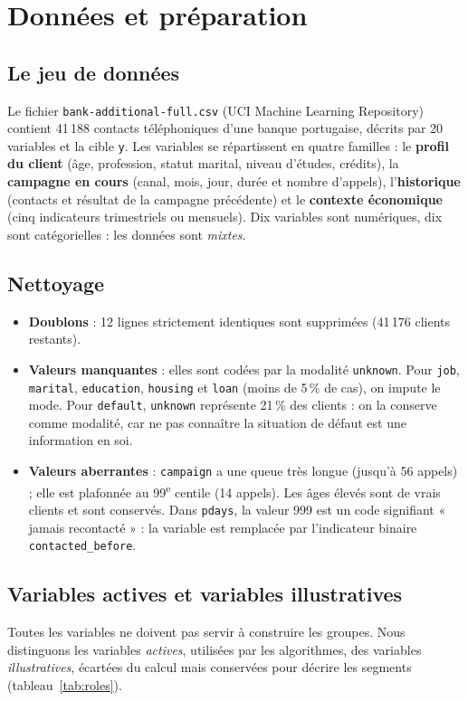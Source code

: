 \documentclass[11pt,a4paper]{article}
\begin{document}
\section{Données et préparation}\label{sec:donnees}

\subsection{Le jeu de données}
Le fichier \texttt{bank-additional-full.csv} (UCI Machine Learning Repository) contient 41\,188 contacts téléphoniques d'une banque portugaise, décrits par 20 variables et la cible \texttt{y}. Les variables se répartissent en quatre familles : le \textbf{profil du client} (âge, profession, statut marital, niveau d'études, crédits), la \textbf{campagne en cours} (canal, mois, jour, durée et nombre d'appels), l'\textbf{historique} (contacts et résultat de la campagne précédente) et le \textbf{contexte économique} (cinq indicateurs trimestriels ou mensuels). Dix variables sont numériques, dix sont catégorielles : les données sont \emph{mixtes}.

\subsection{Nettoyage}
\begin{itemize}
\item \textbf{Doublons} : 12 lignes strictement identiques sont supprimées (41\,176 clients restants).
\item \textbf{Valeurs manquantes} : elles sont codées par la modalité \texttt{unknown}. Pour \texttt{job}, \texttt{marital}, \texttt{education}, \texttt{housing} et \texttt{loan} (moins de 5\,\% de cas), on impute le mode. Pour \texttt{default}, \texttt{unknown} représente 21\,\% des clients : on la conserve comme modalité, car ne pas connaître la situation de défaut est une information en soi.
\item \textbf{Valeurs aberrantes} : \texttt{campaign} a une queue très longue (jusqu'à 56 appels) ; elle est plafonnée au 99\textsuperscript{e} centile (14 appels). Les âges élevés sont de vrais clients et sont conservés. Dans \texttt{pdays}, la valeur 999 est un code signifiant « jamais recontacté » : la variable est remplacée par l'indicateur binaire \texttt{contacted\_before}.
\end{itemize}

\subsection{Variables actives et variables illustratives}
Toutes les variables ne doivent pas servir à construire les groupes. Nous distinguons les variables \emph{actives}, utilisées par les algorithmes, des variables \emph{illustratives}, écartées du calcul mais conservées pour décrire les segments (tableau~\ref{tab:roles}).
\end{document}
